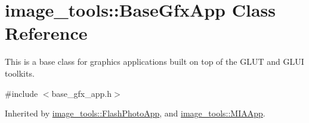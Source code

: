\hypertarget{classimage__tools_1_1BaseGfxApp}{}\section{image\+\_\+tools\+:\+:Base\+Gfx\+App Class Reference}
\label{classimage__tools_1_1BaseGfxApp}


This is a base class for graphics applications built on top of the G\+L\+UT and G\+L\+UI toolkits.  




{\ttfamily \#include $<$base\+\_\+gfx\+\_\+app.\+h$>$}



Inherited by \hyperlink{classimage__tools_1_1FlashPhotoApp}{image\+\_\+tools\+::\+Flash\+Photo\+App}, and \hyperlink{classimage__tools_1_1MIAApp}{image\+\_\+tools\+::\+M\+I\+A\+App}.

